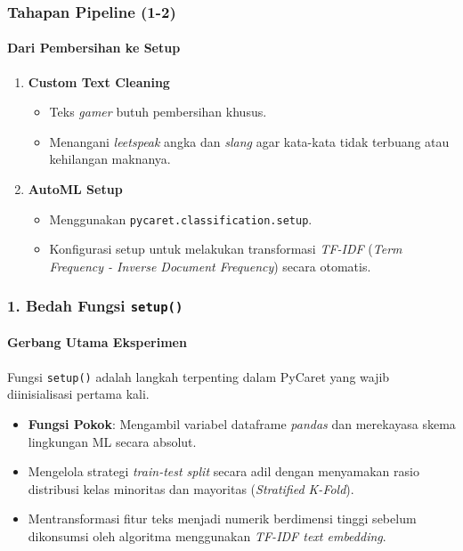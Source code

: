 \documentclass[t,aspectratio=169,xcolor=dvipsnames]{beamer}
\begin{document}
\begin{frame}
    \frametitle{Tahapan Pipeline (1-2)}
    \framesubtitle{Dari Pembersihan ke Setup}
    \small
    \begin{enumerate}
        \item \textbf{Custom Text Cleaning}
        \begin{itemize}
            \item Teks \textit{gamer} butuh pembersihan khusus.
            \item Menangani \textit{leetspeak} angka dan \textit{slang} agar kata-kata tidak terbuang atau kehilangan maknanya.
        \end{itemize}
        \vspace{0.2cm}
        \item \textbf{AutoML Setup}
        \begin{itemize}
            \item Menggunakan \texttt{pycaret.classification.setup}.
            \item Konfigurasi setup untuk melakukan transformasi \textit{TF-IDF} (\textit{Term Frequency - Inverse Document Frequency}) secara otomatis.
        \end{itemize}
    \end{enumerate}
\end{frame}

\begin{frame}
    \frametitle{1. Bedah Fungsi \texttt{setup()}}
    \framesubtitle{Gerbang Utama Eksperimen}
    \small
    Fungsi \texttt{setup()} adalah langkah terpenting dalam PyCaret yang wajib diinisialisasi pertama kali.
    \vspace{0.3cm}
    \begin{itemize}
        \item \textbf{Fungsi Pokok}: Mengambil variabel dataframe \textit{pandas} dan merekayasa skema lingkungan ML secara absolut.
        \item Mengelola strategi \textit{train-test split} secara adil dengan menyamakan rasio distribusi kelas minoritas dan mayoritas (\textit{Stratified K-Fold}).
        \item Mentransformasi fitur teks menjadi numerik berdimensi tinggi sebelum dikonsumsi oleh algoritma menggunakan \textit{TF-IDF text embedding}.
    \end{itemize}
\end{frame}
\end{document}
